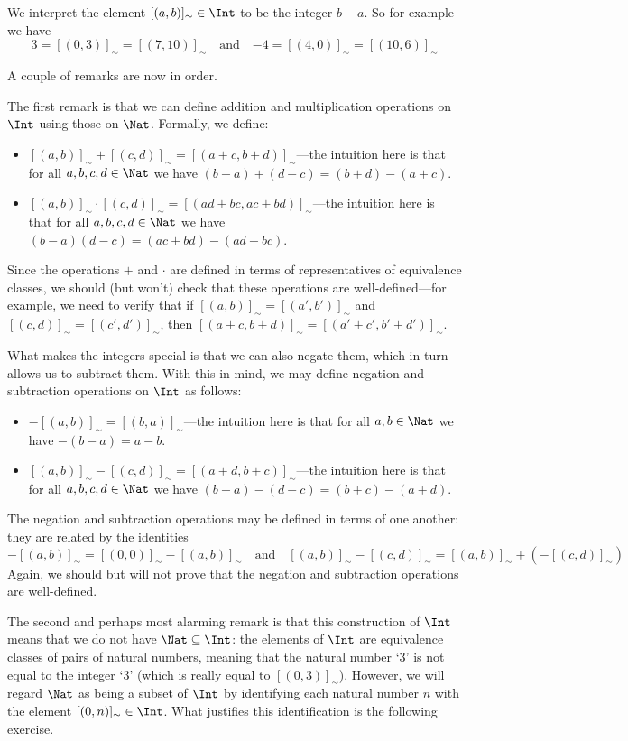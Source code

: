 We interpret the element $[(a,b)]_{\sim} \in \Int$ to be the integer $b-a$. So for example we have
\[ 3 = [(0,3)]_{\sim} = [(7,10)]_{\sim} \quad \text{and} \quad {-4} = [(4,0)]_{\sim} = [(10,6)]_{\sim} \]

A couple of remarks are now in order.

The first remark is that we can define addition and multiplication operations on $\Int$ using those on $\Nat$. Formally, we define:
\begin{itemize}
\item $[(a,b)]_{\sim} + [(c,d)]_{\sim} = [(a+c, b+d)]_{\sim}$---the intuition here is that for all $a,b,c,d \in \Nat$ we have $(b-a) + (d-c) = (b+d) - (a+c)$.
\item $[(a,b)]_{\sim} \cdot [(c,d)]_{\sim} = [(ad+bc, ac+bd)]_{\sim}$---the intuition here is that for all $a,b,c,d \in \Nat$ we have $(b-a)(d-c) = (ac+bd) - (ad+bc)$.
\end{itemize}
Since the operations $+$ and $\cdot$ are defined in terms of representatives of equivalence classes, we should (but won't) check that these operations are well-defined---for example, we need to verify that if $[(a,b)]_{\sim} = [(a',b')]_{\sim}$ and $[(c,d)]_{\sim} = [(c',d')]_{\sim}$, then $[(a+c,b+d)]_{\sim} = [(a'+c',b'+d')]_{\sim}$.

What makes the integers special is that we can also negate them, which in turn allows us to subtract them. With this in mind, we may define negation and subtraction operations on $\Int$ as follows:
\begin{itemize}
\item $-[(a,b)]_{\sim} = [(b,a)]_{\sim}$---the intuition here is that for all $a,b \in \Nat$ we have $-(b-a) = a-b$.
\item $[(a,b)]_{\sim} - [(c,d)]_{\sim} = [(a+d,b+c)]_{\sim}$---the intuition here is that for all $a,b,c,d \in \Nat$ we have $(b-a) - (d-c) = (b+c) - (a+d)$.
\end{itemize}
The negation and subtraction operations may be defined in terms of one another: they are related by the identities
\[ -[(a,b)]_{\sim} = [(0,0)]_{\sim} - [(a,b)]_{\sim} \quad \text{and} \quad [(a,b)]_{\sim} - [(c,d)]_{\sim} = [(a,b)]_{\sim} + (-[(c,d)]_{\sim}) \]
Again, we should but will not prove that the negation and subtraction operations are well-defined.

The second and perhaps most alarming remark is that this construction of $\Int$ means that we do not have $\Nat \subseteq \Int$: the elements of $\Int$ are equivalence classes of pairs of natural numbers, meaning that the natural number `$3$' is not equal to the integer `$3$' (which is really equal to $[(0,3)]_{\sim}$). However, we will regard $\Nat$ as being a subset of $\Int$ by identifying each natural number $n$ with the element $[(0,n)]_{\sim} \in \Int$. What justifies this identification is the following exercise.

